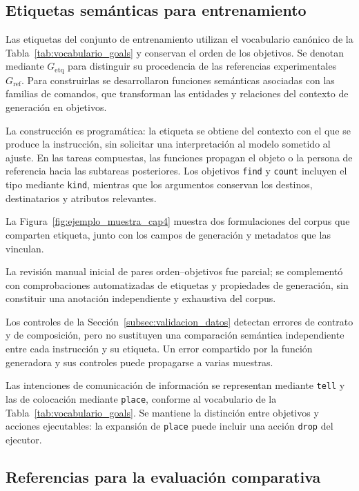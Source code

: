 \subsection{Etiquetas semánticas para entrenamiento}
\label{subsec:etiquetas_entrenamiento}

Las etiquetas del conjunto de entrenamiento utilizan el vocabulario canónico de la Tabla~\ref{tab:vocabulario_goals} y conservan el orden de los objetivos. Se denotan mediante $G_{\mathrm{etq}}$ para distinguir su procedencia de las referencias experimentales $G_{\mathrm{ref}}$. Para construirlas se desarrollaron funciones semánticas asociadas con las familias de comandos, que transforman las entidades y relaciones del contexto de generación en objetivos.

La construcción es programática: la etiqueta se obtiene del contexto con
el que se produce la instrucción, sin solicitar una interpretación al
modelo sometido al ajuste. En las tareas compuestas, las funciones
propagan el objeto o la persona de referencia hacia las subtareas
posteriores. Los objetivos \texttt{find} y \texttt{count} incluyen el
tipo mediante \texttt{kind}, mientras que los argumentos conservan los
destinos, destinatarios y atributos relevantes.

La Figura~\ref{fig:ejemplo_muestra_cap4} muestra dos formulaciones del corpus que comparten etiqueta, junto con los campos de generación y metadatos que las vinculan.

La revisión manual inicial de pares orden--objetivos fue parcial; se complementó con comprobaciones automatizadas de etiquetas y propiedades de generación, sin constituir una anotación independiente y exhaustiva del corpus.

Los controles de la Sección~\ref{subsec:validacion_datos} detectan errores de contrato y de composición, pero no sustituyen una comparación semántica independiente entre cada instrucción y su etiqueta. Un error compartido por la función generadora y sus controles puede propagarse a varias muestras.

Las intenciones de comunicación de información se representan mediante
\texttt{tell} y las de colocación mediante \texttt{place}, conforme al
vocabulario de la Tabla~\ref{tab:vocabulario_goals}. Se mantiene la
distinción entre objetivos y acciones ejecutables: la expansión de
\texttt{place} puede incluir una acción \texttt{drop} del ejecutor.

\subsection{Referencias para la evaluación comparativa}
\label{subsec:referencias_experimentales}

